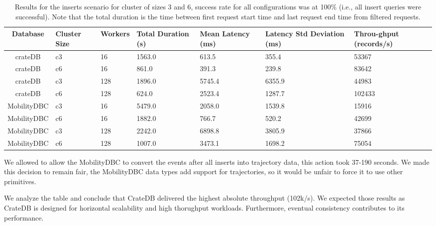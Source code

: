 \begin{table}[ht]
  \centering
  \begin{tabularx}{\textwidth}{|c|Y|Y|Y|Y|Y|Y|}
    \hline
    Database & Cluster Size&  Workers  &Total Duration (s) &Mean Latency (ms) & Latency Std Deviation (ms) & Throu-ghput (records/s) \\
    \hline
    crateDB           &c3       &16             &1563.0              &613.5              &355.4                  &53367\\
    crateDB           &c6       &16              &861.0              &391.3              &239.8                  &83642\\
    crateDB           &c3      &128             &1896.0             &5745.4             &6355.9                  &44983\\
    crateDB           &c6      &128              &624.0             &2523.4             &1287.7                 &102433\\
    \hline
    MobilityDBC           &c3       &16             &5479.0             &2058.0             &1539.8                  &15916\\
    MobilityDBC           &c6       &16             &1882.0              &766.7              &520.2                  &42699\\
    MobilityDBC           &c3      &128             &2242.0             &6898.8             &3805.9                  &37866\\
    MobilityDBC           &c6      &128             &1007.0             &3473.1             &1698.2                  &75054\\
    \hline
  \end{tabularx}
  \caption{Results for the inserts scenario for cluster of sizes 3 and 6, success rate for all configurations was at 100\% (i.e., all insert queries were successful).
    Note that the total duration is the time between first request start time and last request end time from filtered requests.
  }
  \label{tab:inserts-table}
\end{table}

We allowed to allow the MobilityDBC to convert the events after all inserts into trajectory data, this action took 37-190 seconds.
We made this decision to remain fair, the MobilityDBC data types add support for trajectories, so it would be unfair to force it to use other primitives.

We analyze the table and conclude that CrateDB delivered the highest absolute throughput (102k/s).
We expected those results as CrateDB is designed for horizontal scalability and high thorughput workloads.
Furthermore, eventual consistency contributes to its performance.

